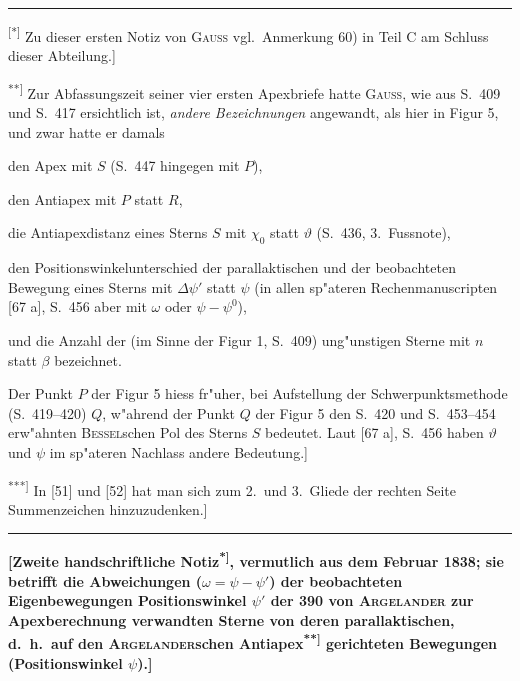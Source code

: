 \documentclass[12pt,a4paper]{article}
\theoremstyle{plain}
\theoremstyle{definition}
\theoremstyle{remark}
\begin{document}
\rule{\textwidth}{0.4pt}
{\small
\textsuperscript{[*]} Zu dieser ersten Notiz von \textsc{Gauss} vgl.\ Anmerkung 60) in Teil C am Schluss dieser Abteilung.]

\textsuperscript{**]} Zur Abfassungszeit seiner vier ersten Apexbriefe hatte \textsc{Gauss}, wie aus S.\ 409 und S.\ 417 ersichtlich ist, {\itshape andere Bezeichnungen} angewandt, als hier in Figur 5, und zwar hatte er damals

\quad den Apex mit $S$ (S.\ 447 hingegen mit $P$),

\quad den Antiapex mit $P$ statt $R$,

\quad die Antiapexdistanz eines Sterns $S$ mit $\chi_0$ statt $\vartheta$ (S.\ 436, 3.\ Fussnote),

\quad den Positionswinkelunterschied der parallaktischen und der beobachteten Bewegung eines Sterns mit $\Delta\psi'$ statt $\psi$ (in allen sp"ateren Rechenmanuscripten {[67 a], S.\ 456} aber mit $\omega$ oder $\psi - \psi^0$),

\quad und die Anzahl der (im Sinne der Figur 1, S.\ 409) \glq{}ung"unstigen\grq{} Sterne mit $n$ statt $\beta$ bezeichnet.

Der Punkt $P$ der Figur 5 hiess fr"uher, bei Aufstellung der \glq{}Schwerpunktsmethode\grq{} (S.\ 419--420) $Q$, w"ahrend der Punkt $Q$ der Figur 5 den S.\ 420 und S.\ 453--454 erw"ahnten \glq{}\textsc{Bessel}schen Pol\grq{} des Sterns $S$ bedeutet. Laut [67 a], S.\ 456 haben $\vartheta$ und $\psi$ im sp"ateren Nachlass andere Bedeutung.]

\textsuperscript{***]} In [51] und [52] hat man sich zum 2.\ und 3.\ Gliede der rechten Seite Summenzeichen hinzuzudenken.]
}
\rule{\textwidth}{0.4pt}


\newpage
\begin{center}
\textbf{[Zweite handschriftliche Notiz\textsuperscript{*]}, vermutlich aus dem Februar 1838; sie betrifft die Abweichungen ($\omega = \psi - \psi'$) der beobachteten Eigenbewegungen Positionswinkel $\psi'$ der 390 von \textsc{Argelander} zur Apexberechnung verwandten Sterne von deren parallaktischen, d.\ h.\ auf den \textsc{Argelander}schen Antiapex\textsuperscript{**]} gerichteten Bewegungen (Positionswinkel $\psi$).]}
\end{center}
\end{document}
